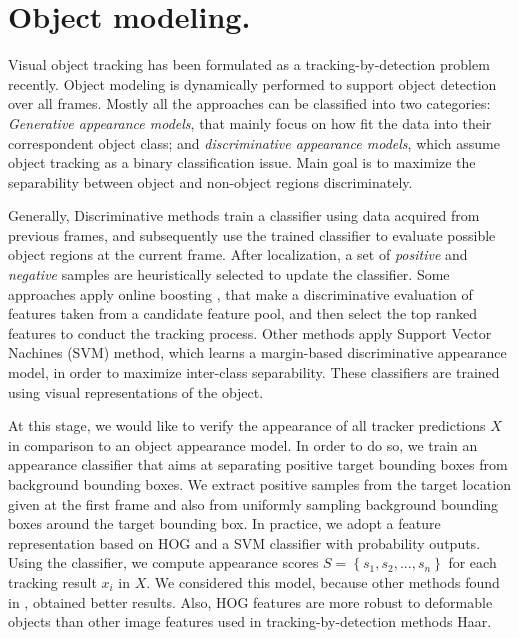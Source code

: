 \section{Object modeling.}
Visual object tracking has been formulated as a tracking-by-detection problem
recently. Object modeling is dynamically performed to support object detection
over all frames. Mostly all the approaches can be classified into two categories:
\textit{Generative appearance models}, that mainly focus on how fit the data into
their correspondent object class; and \textit{discriminative appearance models},
which assume object tracking as a binary classification issue. Main goal is to
maximize the separability between object and non-object regions discriminately.

Generally, Discriminative methods train a classifier using data acquired from
previous frames, and subsequently use the trained classifier to evaluate
possible object regions at the current frame. After localization, a set of
\textit{positive} and \textit{negative} samples are heuristically selected to
update the classifier. Some approaches apply online boosting
\cite{Babenko2010,Grabner2008,Grabner2006}, that make a discriminative
evaluation of features taken from a candidate feature pool, and then select the
top ranked features to conduct the tracking process. Other methods apply
Support Vector Nachines (SVM) method, which learns a margin-based discriminative
appearance model, in order to maximize inter-class separability. These
classifiers are trained using visual representations of the object.

At this stage, we would like to verify the appearance of all tracker
predictions $X$ in comparison to an object appearance model.
In order to do so, we train an appearance classifier that aims at separating
positive target bounding boxes from background bounding boxes.
We extract positive samples from the target location given at the first frame
and also from uniformly sampling background bounding boxes around the target
bounding box.
In practice, we adopt a feature representation based on HOG and a SVM
classifier with probability outputs.
Using the classifier, we compute appearance scores  
$S = \left \{ s_1, s_2, ..., s_n \right \}$ for each tracking result $x_i$ in
$X$. We considered this model, because other methods found in 
\cite{zhang2014meem,Bai2013}, obtained better results. Also, HOG features are
more robust to deformable objects than other image features used in
tracking-by-detection methods \eg Haar.


